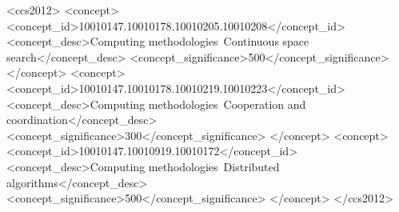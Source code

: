 \documentclass[sigconf]{acmart}
\begin{document}
%
%
\begin{CCSXML}
  <ccs2012>
  <concept>
  <concept_id>10010147.10010178.10010205.10010208</concept_id>
  <concept_desc>Computing methodologies~Continuous space search</concept_desc>
  <concept_significance>500</concept_significance>
  </concept>
  <concept>
  <concept_id>10010147.10010178.10010219.10010223</concept_id>
  <concept_desc>Computing methodologies~Cooperation and coordination</concept_desc>
  <concept_significance>300</concept_significance>
  </concept>
  <concept>
  <concept_id>10010147.10010919.10010172</concept_id>
  <concept_desc>Computing methodologies~Distributed algorithms</concept_desc>
  <concept_significance>500</concept_significance>
  </concept>
  </ccs2012>
\end{CCSXML}
  



\maketitle




 
\end{document}
